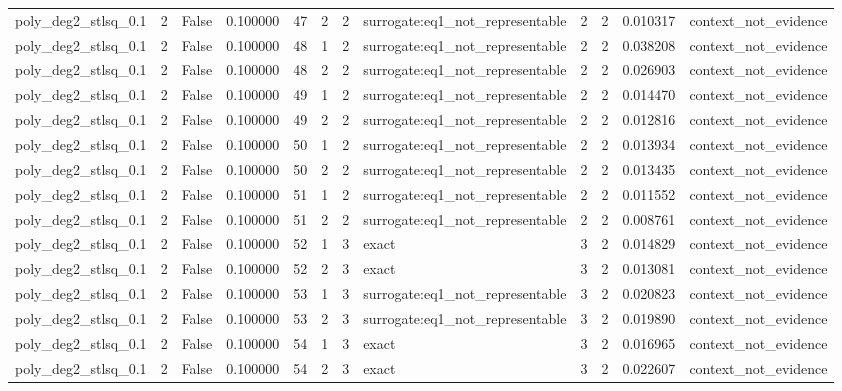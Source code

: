 \begin{tabular}{lrrrrrrlrrrl}
poly\_deg2\_stlsq\_0.1 & 2 & False & 0.100000 & 47 & 2 & 2 & surrogate:eq1\_not\_representable & 2 & 2 & 0.010317 & context\_not\_evidence \\
poly\_deg2\_stlsq\_0.1 & 2 & False & 0.100000 & 48 & 1 & 2 & surrogate:eq1\_not\_representable & 2 & 2 & 0.038208 & context\_not\_evidence \\
poly\_deg2\_stlsq\_0.1 & 2 & False & 0.100000 & 48 & 2 & 2 & surrogate:eq1\_not\_representable & 2 & 2 & 0.026903 & context\_not\_evidence \\
poly\_deg2\_stlsq\_0.1 & 2 & False & 0.100000 & 49 & 1 & 2 & surrogate:eq1\_not\_representable & 2 & 2 & 0.014470 & context\_not\_evidence \\
poly\_deg2\_stlsq\_0.1 & 2 & False & 0.100000 & 49 & 2 & 2 & surrogate:eq1\_not\_representable & 2 & 2 & 0.012816 & context\_not\_evidence \\
poly\_deg2\_stlsq\_0.1 & 2 & False & 0.100000 & 50 & 1 & 2 & surrogate:eq1\_not\_representable & 2 & 2 & 0.013934 & context\_not\_evidence \\
poly\_deg2\_stlsq\_0.1 & 2 & False & 0.100000 & 50 & 2 & 2 & surrogate:eq1\_not\_representable & 2 & 2 & 0.013435 & context\_not\_evidence \\
poly\_deg2\_stlsq\_0.1 & 2 & False & 0.100000 & 51 & 1 & 2 & surrogate:eq1\_not\_representable & 2 & 2 & 0.011552 & context\_not\_evidence \\
poly\_deg2\_stlsq\_0.1 & 2 & False & 0.100000 & 51 & 2 & 2 & surrogate:eq1\_not\_representable & 2 & 2 & 0.008761 & context\_not\_evidence \\
poly\_deg2\_stlsq\_0.1 & 2 & False & 0.100000 & 52 & 1 & 3 & exact & 3 & 2 & 0.014829 & context\_not\_evidence \\
poly\_deg2\_stlsq\_0.1 & 2 & False & 0.100000 & 52 & 2 & 3 & exact & 3 & 2 & 0.013081 & context\_not\_evidence \\
poly\_deg2\_stlsq\_0.1 & 2 & False & 0.100000 & 53 & 1 & 3 & surrogate:eq1\_not\_representable & 3 & 2 & 0.020823 & context\_not\_evidence \\
poly\_deg2\_stlsq\_0.1 & 2 & False & 0.100000 & 53 & 2 & 3 & surrogate:eq1\_not\_representable & 3 & 2 & 0.019890 & context\_not\_evidence \\
poly\_deg2\_stlsq\_0.1 & 2 & False & 0.100000 & 54 & 1 & 3 & exact & 3 & 2 & 0.016965 & context\_not\_evidence \\
poly\_deg2\_stlsq\_0.1 & 2 & False & 0.100000 & 54 & 2 & 3 & exact & 3 & 2 & 0.022607 & context\_not\_evidence \\

\end{tabular}
